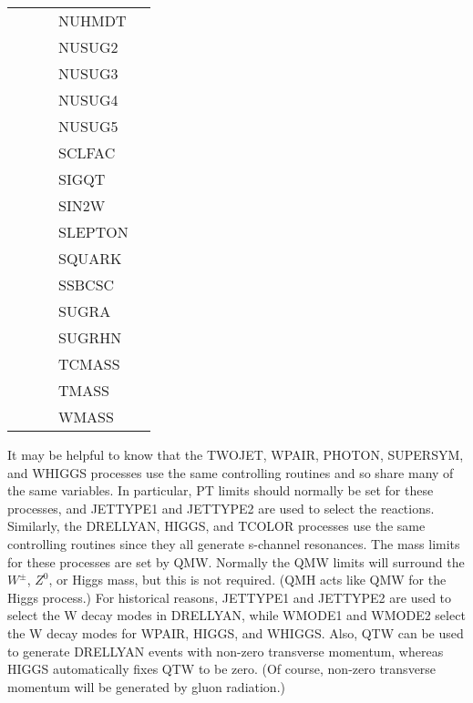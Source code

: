 \begin{center}
\begin{tabular}{lllll}
            &             &             & NUHMDT      & \\
            &             &             & NUSUG2      & \\
            &             &             & NUSUG3      & \\
            &             &             & NUSUG4      & \\
            &             &             & NUSUG5      & \\
            &             &             & SCLFAC      & \\
            &             &             & SIGQT       & \\
            &             &             & SIN2W       & \\
            &             &             & SLEPTON     & \\
            &             &             & SQUARK      & \\
            &             &             & SSBCSC      & \\
            &             &             & SUGRA       & \\
            &             &             & SUGRHN      & \\
            &             &             & TCMASS      & \\
            &             &             & TMASS       & \\
            &             &             & WMASS       & \\
\hline\hline
\end{tabular}
\end{center}

      It may be helpful to know that the TWOJET, WPAIR, PHOTON,
SUPERSYM, and WHIGGS processes use the same controlling routines and
so share many of the same variables.  In particular, PT limits should
normally be set for these processes, and JETTYPE1 and JETTYPE2 are
used to select the reactions. Similarly, the DRELLYAN, HIGGS, and
TCOLOR processes use the same controlling routines since they all
generate s-channel resonances. The mass limits for these processes are
set by QMW.  Normally the QMW limits will surround the $W^\pm$, $Z^0$,
or Higgs mass, but this is not required.  (QMH acts like QMW for the
Higgs process.) For historical reasons, JETTYPE1 and JETTYPE2 are used
to select the W decay modes in DRELLYAN, while WMODE1 and WMODE2 select
the W decay modes for WPAIR, HIGGS, and WHIGGS. Also, QTW can be used
to generate DRELLYAN events with non-zero transverse momentum, whereas
HIGGS automatically fixes QTW to be zero. (Of course, non-zero
transverse momentum will be generated by gluon radiation.)

